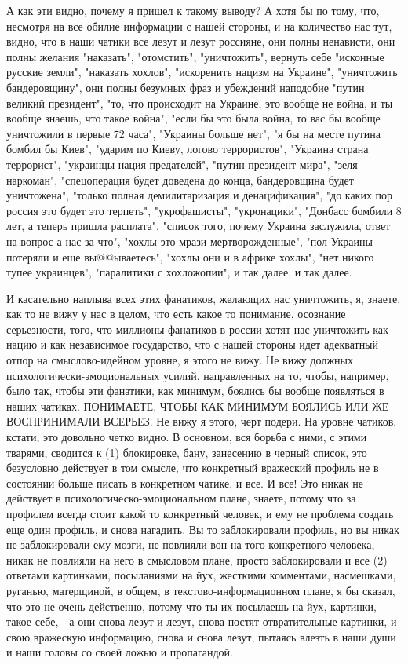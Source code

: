 А как эти видно, почему я пришел к такому выводу? А хотя бы по тому, что,
несмотря на все обилие информации с нашей стороны, и на количество нас тут,
видно, что в наши чатики все лезут и лезут россияне, они полны ненависти, они
полны желания "наказать", "отомстить", "уничтожить", вернуть себе "исконные
русские земли", "наказать хохлов", "искоренить нацизм на Украине", "уничтожить
бандеровщину", они полны безумных фраз и убеждений наподобие "путин великий
президент", "то, что происходит на Украине, это вообще не война, и ты вообще
знаешь, что такое война", "если бы это была война, то вас бы вообще уничтожили
в первые 72 часа", "Украины больше нет", "я бы на месте путина бомбил бы Киев",
"ударим по Киеву, логово террористов", "Украина страна террорист", "украинцы
нация предателей", "путин президент мира", "зеля наркоман", "спецоперация будет
доведена до конца, бандеровщина будет уничтожена", "только полная
демилитаризация и денацификация", "до каких пор россия это будет это терпеть",
"укрофашисты", "укронацики", "Донбасс бомбили 8 лет, а теперь пришла расплата",
"список того, почему Украина заслужила, ответ на вопрос а нас за что", "хохлы
это мрази мертворожденные", "пол Украины потеряли и еще вы@@ываетесь", "хохлы
они и в африке хохлы", "нет никого тупее украинцев", "паралитики с хохложопии",
и так далее, и так далее. 

И касательно наплыва всех этих фанатиков, желающих нас уничтожить, я, знаете,
как то не вижу у нас в целом, что есть какое то понимание, осознание
серьезности, того, что миллионы фанатиков в россии хотят нас уничтожить как
нацию и как независимое государство, что с нашей стороны идет адекватный отпор
на смыслово-идейном уровне, я этого не вижу. Не вижу должных
психологически-эмоциональных усилий, направленных на то, чтобы, например, было
так, чтобы эти фанатики, как минимум, боялись бы вообще появляться в наших
чатиках. ПОНИМАЕТЕ, ЧТОБЫ КАК МИНИМУМ БОЯЛИСЬ ИЛИ ЖЕ ВОСПРИНИМАЛИ ВСЕРЬЕЗ. Не
вижу я этого, черт подери.  На уровне чатиков, кстати, это довольно четко
видно. В основном, вся борьба с ними, с этими тварями, сводится к (1)
блокировке, бану, занесению в черный список, это безусловно действует в том
смысле, что конкретный вражеский профиль не в состоянии больше писать в
конкретном чатике, и все. И все!  Это никак не действует в
психологическо-эмоциональном плане, знаете, потому что за профилем всегда стоит
какой то конкретный человек, и ему не проблема создать еще один профиль, и
снова нагадить. Вы то заблокировали профиль, но вы никак не заблокировали ему
мозги, не повлияли вон на того конкретного человека, никак не повлияли на него
в смысловом плане, просто заблокировали и все (2) ответами картинками,
посыланиями на йух, жесткими комментами, насмешками, руганью, матерщиной, в
общем, в текстово-информационном плане, я бы сказал, что это не очень
действенно, потому что ты их посылаешь на йух, картинки, такое себе, - а они
снова лезут и лезут, снова постят отвратительные картинки, и свою вражескую
информацию, снова и снова лезут, пытаясь влезть в наши души и наши головы со
своей ложью и пропагандой.

